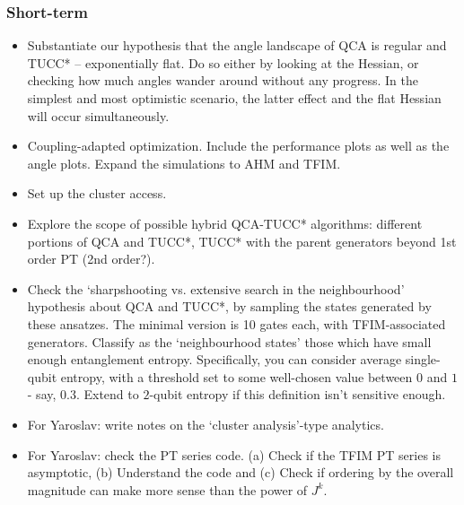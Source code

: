 \documentclass[10pt, a4paper]{article}
\begin{document}
\subsubsection*{Short-term}
\begin{itemize}

\item Substantiate our hypothesis that the angle landscape of QCA is regular and TUCC* -- exponentially flat. Do so either by looking at the Hessian, or checking how much angles wander around without any progress. In the simplest and most optimistic scenario, the latter effect and the flat Hessian will occur simultaneously.

\item Coupling-adapted optimization. Include the performance plots as well as the angle plots. Expand the simulations to AHM and TFIM.

\item Set up the cluster access.

\item Explore the scope of possible hybrid QCA-TUCC* algorithms: different portions of QCA and TUCC*, TUCC* with the parent generators beyond 1st order PT (2nd order?). 

\item Check the `sharpshooting vs. extensive search in the neighbourhood' hypothesis about QCA and TUCC*, by sampling the states generated by these ansatzes. The minimal version is 10 gates each, with TFIM-associated generators. Classify as the `neighbourhood states' those which have small enough entanglement entropy. Specifically, you can consider average single-qubit entropy, with a threshold set to some well-chosen value between $0$ and $1$ - say, $0.3$. Extend to $2$-qubit entropy if this definition isn't sensitive enough.

\item For Yaroslav: write notes on the `cluster analysis'-type analytics.

\item For Yaroslav: check the PT series code. (a) Check if the TFIM PT series is asymptotic, (b) Understand the code and (c) Check if ordering by the overall magnitude can make more sense than the power of $J^k$.

\end{itemize}
\end{document}
